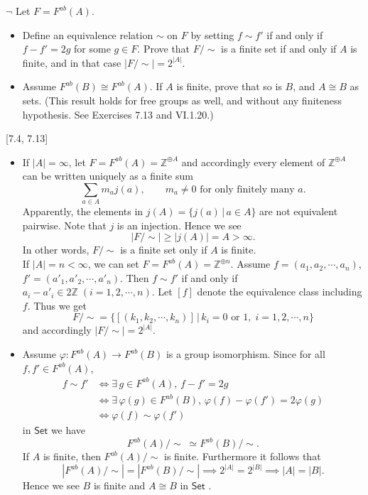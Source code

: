 \documentclass[12pt,letterpaper,boxed]{hmcpset}
\newcommand{\Set}{\mathsf{Set}}
\begin{document}
\hypertarget{Exercise II.5.10}{}
\begin{problem}[5.10]
$\neg$ Let $F = F^{ab}(A)$.
\begin{itemize}
	\item Define an equivalence relation $\sim$ on $F$ by setting $f\sim f'$ if and only if $f-f'=2g$ for some $g\in F$. Prove that $F/\sim$ is a finite set if and only if $A$ is finite, and in that case $|F/\sim| = 2^{|A|}$.
	\item Assume $F^{ab}(B)\cong F^{ab}(A)$. If $A$ is finite, prove that so is $B$, and $A\cong B$ as sets.	(This result holds for free groups as well, and without any finiteness hypothesis.	See Exercises 7.13 and VI.1.20.)
\end{itemize}
[7.4, 7.13]
\end{problem}
\begin{solution}
	\begin{itemize}
		\item If $|A|=\infty$, let $F=F^{ab}(A)= \mathbb{Z}^{\oplus A}$ and accordingly every element of $\mathbb{Z}^{\oplus A}$ can be written uniquely as a finite sum
		\[
		\sum_{a\in A}m_aj(a),\qquad m_a\ne0\text{ for only finitely many }a.
		\]
		Apparently, the elements in $j(A)=\{j(a)\,|\,a\in A\}$ are not equivalent pairwise. Note that $j$ is an injection. Hence we see
		\[
		|F/\sim|\ge|j(A)|=A>\infty.
		\]
		In other words, $F/\sim$ is a finite set only if $A$ is finite.\\
		If $|A|=n<\infty$, we can set $F=F^{ab}(A)= \mathbb{Z}^{\oplus n}$. Assume $f=(a_1,a_2,\cdots,a_n)$, $f'=(a'_1,a'_2,\cdots,a'_n)$. Then $f\sim f'$ if and only if $a_i-a'_i\in 2\mathbb{Z}\;(i=1,2,\cdots,n)$. Let $[f]$ denote the equivalence class including $f$. Thus we get 
		\[
		F/\sim=\{[(k_1,k_2,\cdots,k_n)]\,|\,k_i=0\text{ or }1,\;i=1,2,\cdots,n\}
		\]
		and accordingly $|F/\sim| = 2^{|A|}$.
		\item Assume $\varphi:F^{ab}(A)\to F^{ab}(B)$ is a group isomorphism. Since for all $f,f'\in F^{ab}(A)$,
		\begin{align*}
			f\sim f'&\iff\exists\, g\in F^{ab}(A),\, f-f'=2g\\
			&\iff\exists\, \varphi(g)\in F^{ab}(B),\, \varphi(f)-\varphi(f')=2\varphi(g)\\
			&\iff\varphi(f)\sim\varphi(f')
		\end{align*}
		in $\mathsf{Set}$ we have 
		$$F^{ab}(A)/\sim\;\simeq F^{ab}(B)/\sim.$$
		If $A$ is finite, then $F^{ab}(A)/\sim$ is finite. Furthermore it follows that
		\[
		|F^{ab}(A)/\sim| = |F^{ab}(B)/\sim|\implies 2^{|A|}=2^{|B|}\implies |A|=|B|.
		\]
		Hence we see $B$ is finite and $A\cong B$ in $\Set$ .
	\end{itemize}
\end{solution}
\end{document}
